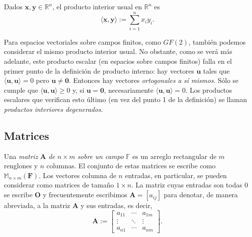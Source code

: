             Dados $\mathbf{x,y} \in \mathbb{R}^{n}$, el producto interior usual en $\mathbb{R}^{n}$ es $$ \langle \mathbf{x,y}\rangle := \sum_{i = 1}^{n} x_{i}y_{i}.$$
            
            Para espacios vectoriales sobre campos finitos, como $GF(2)$, también podemos considerar el mismo producto interior usual. No obstante, como se verá más adelante, este producto escalar (en espacios sobre campos finitos) falla en el primer punto de la definición de producto interno: hay vectores $\mathbf{u}$ tales que $\langle \mathbf{u,u}\rangle = 0$ pero $\mathbf{u}\neq \mathbf{0}$. Entonces hay vectores \textit{ortogonales a sí mismos}. Sólo se cumple que $\langle \mathbf{u},\mathbf{u}\rangle \geq 0$ y, si $\mathbf{u} = \mathbf{0}$, necesariamente $\langle \mathbf{u,u}\rangle = 0$. Los productos escalares que verifican esto último (en vez del punto 1 de la definición) se llaman \textit{productos interiores degenerados}. 

        \subsection{Matrices}
            Una \textit{matriz} $\mathbf{A}$ \textit{de} $n \times m$ \textit{sobre un campo} $\mathbb{F}$ es un arreglo rectangular de  $m$ renglones y $n$ columnas. El conjunto de estas matrices se escribe como $\mathbb{M}_{n \times m}(\mathbf{F})$. Los vectores columna de $n$ entradas, en particular, se pueden considerar como matrices de tamaño $1 \times n$.  La matriz cuyas entradas son todas $0$ se escribe $\mathbf{O}$ y frecuentemente escribimos $\mathbf{A} = [a_{ij}]$ para denotar, de manera abreviada, a la matriz $\mathbf{A}$ y sus entradas, es decir,
                $$
                \mathbf{A}:= \begin{bmatrix}
                a_{11} & \cdots & a_{1m}\\ 
                \vdots & \ddots &\vdots\\ 
                a_{n1} &\cdots  & a_{nm} 
                \end{bmatrix}.
                $$
                
